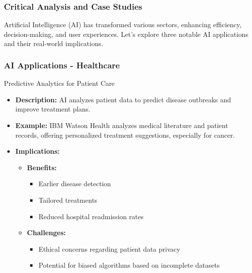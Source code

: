 \documentclass{beamer}
\begin{document}
\begin{frame}[fragile]
    \frametitle{Critical Analysis and Case Studies}
    Artificial Intelligence (AI) has transformed various sectors, enhancing efficiency, decision-making, and user experiences. Let's explore three notable AI applications and their real-world implications.
\end{frame}

\begin{frame}[fragile]
    \frametitle{AI Applications - Healthcare}
    \begin{block}{Predictive Analytics for Patient Care}
        \begin{itemize}
            \item \textbf{Description:} AI analyzes patient data to predict disease outbreaks and improve treatment plans.
            \item \textbf{Example:} IBM Watson Health analyzes medical literature and patient records, offering personalized treatment suggestions, especially for cancer.
            \item \textbf{Implications:}
                \begin{itemize}
                    \item \textbf{Benefits:} 
                        \begin{itemize}
                            \item Earlier disease detection
                            \item Tailored treatments
                            \item Reduced hospital readmission rates
                        \end{itemize}
                    \item \textbf{Challenges:} 
                        \begin{itemize}
                            \item Ethical concerns regarding patient data privacy
                            \item Potential for biased algorithms based on incomplete datasets
                        \end{itemize}
                \end{itemize}
        \end{itemize}
    \end{block}
\end{frame}
\end{document}
